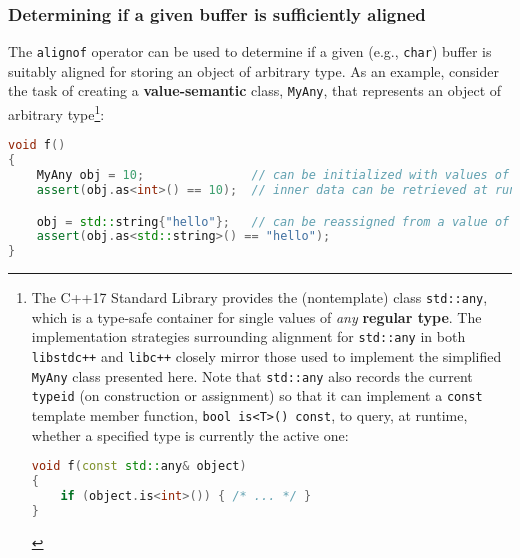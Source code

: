 \subsubsection[Determining if a given buffer is sufficiently aligned]{Determining if a given buffer is sufficiently aligned}\label{determining-if-a-given-buffer-is-sufficiently-aligned}

The \texttt{alignof} operator can be used to determine if a given (e.g.,
\texttt{char}) buffer is suitably aligned for storing an object of
arbitrary type. As an example, consider the task of creating a
\textbf{value-semantic} class, \texttt{MyAny}, that represents an object
of arbitrary type{\cprotect\footnote{The C++17 Standard Library provides
the (nontemplate) class \texttt{std::any}, which is a type-safe
container for single values of \emph{any} \textbf{regular type}. The
implementation strategies surrounding alignment for \texttt{std::any}
in both \texttt{libstdc++} and \texttt{libc++} closely mirror those
used to implement the simplified \texttt{MyAny} class presented here.
Note that \texttt{std::any} also records the current \texttt{typeid}
(on construction or assignment) so that it can implement a
\texttt{const} template member function,
\texttt{bool}~\texttt{is<T>()}~\texttt{const}, to query, at runtime,
whether a specified type is currently the active one:

\begin{lstlisting}[language=C++, basicstyle={\ttfamily\footnotesize}]
void f(const std::any& object)
{
    if (object.is<int>()) { /* ... */ }
}
\end{lstlisting}
      }}:

\begin{lstlisting}[language=C++]
void f()
{
    MyAny obj = 10;               // can be initialized with values of any type
    assert(obj.as<int>() == 10);  // inner data can be retrieved at runtime

    obj = std::string{"hello"};   // can be reassigned from a value of any type
    assert(obj.as<std::string>() == "hello");
}
\end{lstlisting}
    
